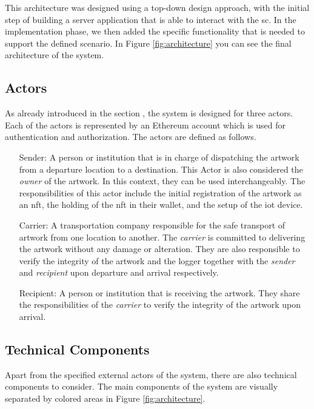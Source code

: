 This architecture was designed using a top-down design approach, with the initial step of building a server application that is able to interact with the \gls{sc}. In the implementation phase, we then added the specific functionality that is needed to support the defined scenario. In Figure \ref{fig:architecture} you can see the final architecture of the system. 

\subsection{Actors}
As already introduced in the section , the system is designed for three actors. Each of the actors is represented by an Ethereum account which is used for authentication and authorization. The actors are defined as follows.

\begin{itemize}[align=left, font=\itshape]
    \item[Sender:] A person or institution that is in charge of dispatching the artwork from a departure location to a destination. This Actor is also considered the \textit{owner} of the artwork. In this context, they can be used interchangeably. The responsibilities of this actor include the initial registration of the artwork as an \gls{nft}, the holding of the \gls{nft} in their \gls{wallet}, and the setup of the \gls{iot} device.

    \item[Carrier:] A transportation company responsible for the safe transport of artwork from one location to another. The \textit{carrier} is committed to delivering the artwork without any damage or alteration. They are also responsible to verify the integrity of the artwork and the logger together with the \textit{sender} and \textit{recipient} upon departure and arrival respectively.

    \item[Recipient:] A person or institution that is receiving the artwork. They share the responsibilities of the \textit{carrier} to verify the integrity of the artwork upon arrival. 
\end{itemize}

\subsection{Technical Components}
Apart from the specified external actors of the system, there are also technical components to consider. The main components of the system are visually separated by colored areas in Figure \ref{fig:architecture}.

